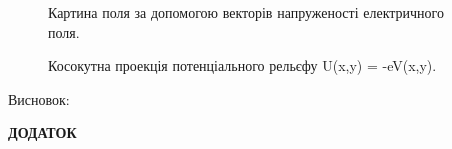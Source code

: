 \documentclass[14pt,a4paper]{scrartcl}
\begin{document}
\begin{center}
\begin{figure}[h]
\caption{Картина поля за допомогою векторів напруженості електричного поля.}
\label{ris:image3}
\end{figure}

\newpage

\begin{figure}[h]

\caption{Косокутна проекція потенціального рельєфу U(x,y) = -eV(x,y).}
\label{ris:image4}
\end{figure}
\end{center}







\clearpage
Висновок: \\








\clearpage
\begin{center}
\textbf{ДОДАТОК}
\end{center}
\end{document}
